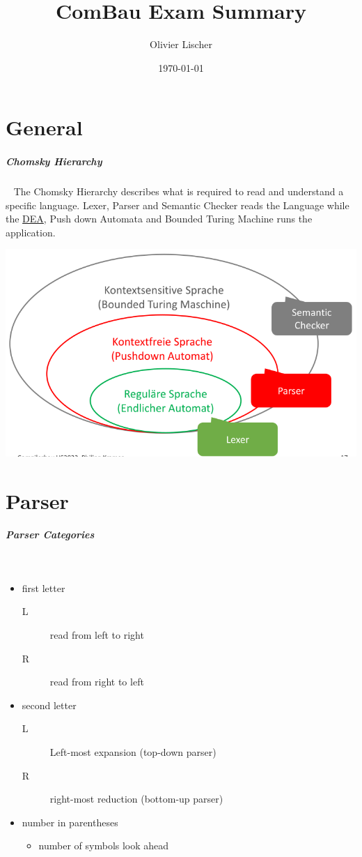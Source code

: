 \documentclass[12pt,twoside,landscape]{extarticle}
\author{Olivier Lischer}
\date{\today}
\title{ComBau Exam Summary}
\begin{document}
\begin{multicols}{4}

\section{General}
\label{sec:org16b38b4}
\subparagraph{Chomsky Hierarchy} \
\label{sec:org2f689fe}
The Chomsky Hierarchy describes what is required to read and understand a specific language.
Lexer, Parser and Semantic Checker reads the Language while the \href{../../../roam/20211109182310-deterministic_finite_automaton.org}{DEA}, Push down Automata and Bounded Turing Machine runs the application.

{
\begin{center}
\includegraphics[width=.9\linewidth]{img/chomsky_hierarchie.png}
\end{center}
\label{fig:chomsky-hierarchy}
}

\section{Parser}
\label{sec:orgd956874}
\subparagraph{Parser Categories} \
\label{sec:org7f00cce}
\begin{itemize}
\item first letter
\begin{description}
\item[{L}] read from left to right
\item[{R}] read from right to left
\end{description}
\item second letter
\begin{description}
\item[{L}] Left-most expansion (top-down parser)
\item[{R}] right-most reduction (bottom-up parser)
\end{description}
\item number in parentheses
\begin{itemize}
\item number of symbols look ahead
\end{itemize}
\end{itemize}


\end{multicols}
\end{document}
